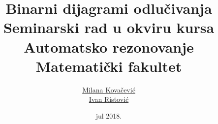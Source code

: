 \documentclass[a4paper]{article}
\theoremstyle{plain}
\theoremstyle{definition}
\begin{document}
\title{Binarni dijagrami odlu\v{c}ivanja\\ \small{Seminarski rad u okviru kursa\\Automatsko rezonovanje\\ Matematički fakultet}}

\author{\href{mailto:mi14031@matf.bg.ac.rs}{Milana Kova\v{c}evi\'c}\\\href{mailto:mi14042@matf.bg.ac.rs}{Ivan Ristovi\'c}}
\date{jul 2018.}

\maketitle



\tableofcontents

\newpage










\newpage

%
\end{document}
